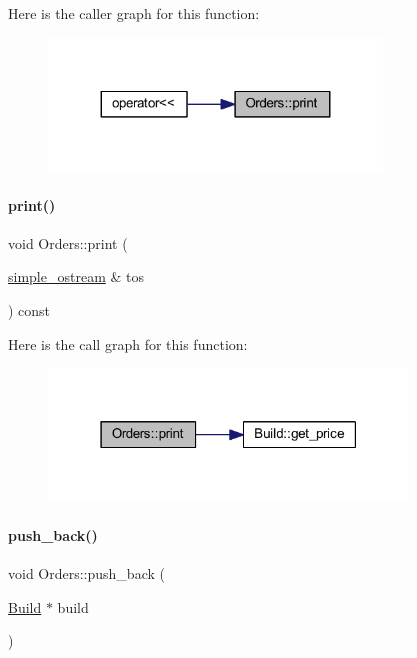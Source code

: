 Here is the caller graph for this function\+:
\nopagebreak
\begin{figure}[H]
\begin{center}
\leavevmode
\includegraphics[width=251pt]{class_orders_a57fb3a5db65235ac3eb6dee473f7ef34_icgraph}
\end{center}
\end{figure}
\mbox{\label{class_orders_a081beda059e45de92599fa48a8668c54}} 
\paragraph{\texorpdfstring{print()}{print()}\hspace{0.1cm}{\footnotesize\ttfamily [2/2]}}
{\footnotesize\ttfamily void Orders\+::print (\begin{DoxyParamCaption}\item[{\mbox{\hyperlink{structsimple__ostream}{simple\+\_\+ostream}} \&}]{tos }\end{DoxyParamCaption}) const}

Here is the call graph for this function\+:
\nopagebreak
\begin{figure}[H]
\begin{center}
\leavevmode
\includegraphics[width=271pt]{class_orders_a081beda059e45de92599fa48a8668c54_cgraph}
\end{center}
\end{figure}
\mbox{\label{class_orders_a6d8d6db032983700fa68cca43dc75a38}} 
\paragraph{\texorpdfstring{push\_back()}{push\_back()}}
{\footnotesize\ttfamily void Orders\+::push\+\_\+back (\begin{DoxyParamCaption}\item[{\mbox{\hyperlink{class_build}{Build}} $\ast$}]{build }\end{DoxyParamCaption})\hspace{0.3cm}{\ttfamily [inline]}}



